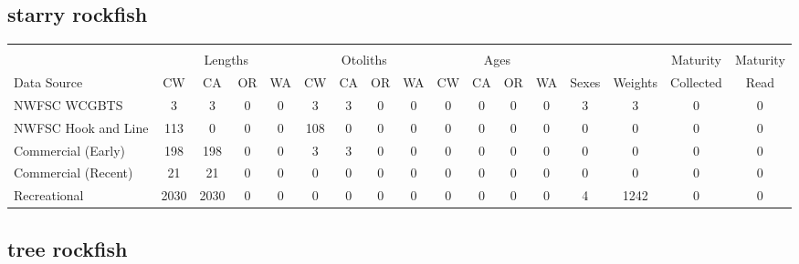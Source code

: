 \documentclass[12pt,]{article}
\begin{document}
\FloatBarrier  

\subsection{starry rockfish}\label{starry-rockfish}

\begin{table}[ht]
\centering
\begingroup\fontsize{10pt}{10pt}\selectfont
\begin{tabular}{|l|cccc|cccc|cccc|c|c|c|c|}
  \hline
 &  &  &  &  &  &  &  &  &  &  &  &  &  &  &  &  \\ 
   & \multicolumn{4}{c}{Lengths} &  \multicolumn{4}{c}{Otoliths} & \multicolumn{4}{c}{Ages} &  & & Maturity & Maturity\\
 Data Source & CW & CA & OR & WA & CW & CA & OR & WA & CW & CA & OR & WA & Sexes & Weights & Collected & Read\\
 \hline
NWFSC WCGBTS & 3 & 3 & 0 & 0 & 3 & 3 & 0 & 0 & 0 & 0 & 0 & 0 & 3 & 3 & 0 & 0 \\ 
  NWFSC Hook and Line & 113 & 0 & 0 & 0 & 108 & 0 & 0 & 0 & 0 & 0 & 0 & 0 & 0 & 0 & 0 & 0 \\ 
  Commercial (Early) & 198 & 198 & 0 & 0 & 3 & 3 & 0 & 0 & 0 & 0 & 0 & 0 & 0 & 0 & 0 & 0 \\ 
  Commercial (Recent) & 21 & 21 & 0 & 0 & 0 & 0 & 0 & 0 & 0 & 0 & 0 & 0 & 0 & 0 & 0 & 0 \\ 
  Recreational & 2030 & 2030 & 0 & 0 & 0 & 0 & 0 & 0 & 0 & 0 & 0 & 0 & 4 & 1242 & 0 & 0 \\ 
   \hline
\end{tabular}
\endgroup
\end{table}

\FloatBarrier  

\subsection{tree rockfish}\label{tree-rockfish}
\end{document}
